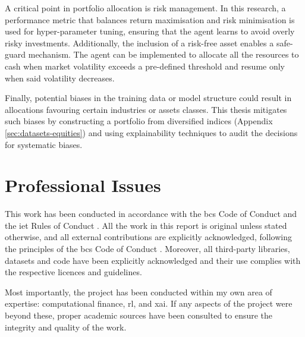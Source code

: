 A critical point in portfolio allocation is risk management. In this research, a performance metric that balances return maximisation and risk minimisation is used for hyper-parameter tuning, ensuring that the agent learns to avoid overly risky investments. Additionally, the inclusion of a risk-free asset enables a safe-guard mechanism. The agent can be implemented to allocate all the resources to cash when market volatility exceeds a pre-defined threshold and resume only when said volatility decreases.

Finally, potential biases in the training data or model structure could result in allocations favouring certain industries or assets classes. This thesis mitigates such biases by constructing a portfolio from diversified indices (Appendix \ref{sec:datasets-equities}) and using explainability techniques to audit the decisions for systematic biases.

\section{Professional Issues} \label{sec:professional-issues}

This work has been conducted in accordance with the \acrfull{bcs} Code of Conduct \cite{BCSCodeConduct} and the \acrfull{iet} Rules of Conduct \cite{IETRules}. All the work in this report is original unless stated otherwise, and all external contributions are explicitly acknowledged, following the principles of the \acrshort{bcs} Code of Conduct \cite{BCSCodeConduct}. Moreover, all third-party libraries, datasets and code have been explicitly acknowledged and their use complies with the respective licences and guidelines.

Most importantly, the project has been conducted within my own area of expertise: computational finance, \acrlong{rl}, and \acrlong{xai}. If any aspects of the project were beyond these, proper academic sources have been consulted to ensure the integrity and quality of the work. 
